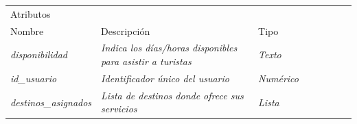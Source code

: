 \begin{table}[H]
    \begin{tabular}{llllllll}
    \cline{1-3}
    \multicolumn{3}{|l|}{\cellcolor[HTML]{F2F2F2}Atributos}                                                                                                                                                                                                    &  &  &  &  &  \\ \cline{1-3}
    \multicolumn{1}{|l|}{Nombre}                                              & \multicolumn{1}{l|}{Descripción}                                                                               & \multicolumn{1}{l|}{Tipo}                                     &  &  &  &  &  \\ \cline{1-3}
    \multicolumn{1}{|l|}{{\color[HTML]{B7B7B7} \textit{disponibilidad}}}      & \multicolumn{1}{l|}{{\color[HTML]{B7B7B7} \textit{Indica los días/horas disponibles para asistir a turistas}}} & \multicolumn{1}{l|}{{\color[HTML]{B7B7B7} \textit{Texto}}}    &  &  &  &  &  \\ \cline{1-3}
    \multicolumn{1}{|l|}{{\color[HTML]{B7B7B7} \textit{id\_usuario}}}         & \multicolumn{1}{l|}{{\color[HTML]{B7B7B7} \textit{Identificador único del usuario}}}                           & \multicolumn{1}{l|}{{\color[HTML]{B7B7B7} \textit{Numérico}}} &  &  &  &  &  \\ \cline{1-3}
    \multicolumn{1}{|l|}{{\color[HTML]{B7B7B7} \textit{destinos\_asignados}}} & \multicolumn{1}{l|}{{\color[HTML]{B7B7B7} \textit{Lista de destinos donde ofrece sus servicios}}}              & \multicolumn{1}{l|}{{\color[HTML]{B7B7B7} \textit{Lista}}}    &  &  &  &  &  \\ \cline{1-3}
    \end{tabular}
    \end{table}

